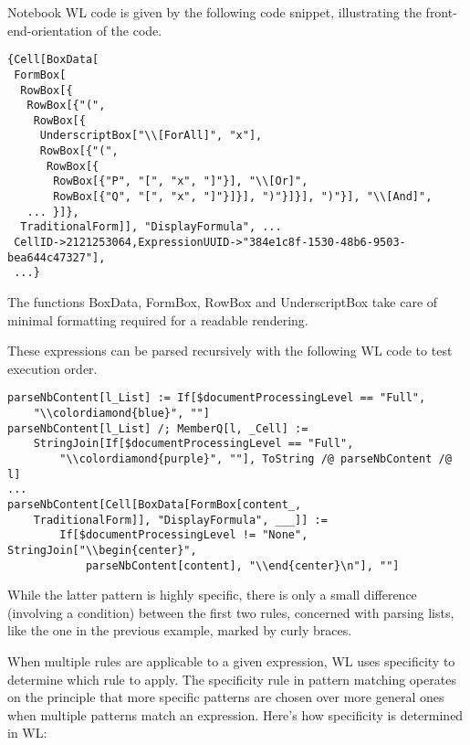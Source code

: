 Notebook WL code is given by the following code snippet, illustrating the front-end-orientation of the code.

\begin{verbatim}
{Cell[BoxData[
 FormBox[
  RowBox[{
   RowBox[{"(", 
    RowBox[{
     UnderscriptBox["\\[ForAll]", "x"], 
     RowBox[{"(", 
      RowBox[{
       RowBox[{"P", "[", "x", "]"}], "\\[Or]", 
       RowBox[{"Q", "[", "x", "]"}]}], ")"}]}], ")"}], "\\[And]", 
   ... }]}, 
  TraditionalForm]], "DisplayFormula", ...
 CellID->2121253064,ExpressionUUID->"384e1c8f-1530-48b6-9503-bea644c47327"],
 ...}
\end{verbatim}

The functions BoxData, FormBox, RowBox and UnderscriptBox take care of minimal formatting required for a readable rendering. 

These expressions can be parsed recursively with the following WL code to test execution order.

\begin{verbatim}
parseNbContent[l_List] := If[$documentProcessingLevel == "Full", 
    "\\colordiamond{blue}", ""]
parseNbContent[l_List] /; MemberQ[l, _Cell] := 
    StringJoin[If[$documentProcessingLevel == "Full", 
        "\\colordiamond{purple}", ""], ToString /@ parseNbContent /@ l] 
...
parseNbContent[Cell[BoxData[FormBox[content_, 
    TraditionalForm]], "DisplayFormula", ___]] := 
        If[$documentProcessingLevel != "None", StringJoin["\\begin{center}", 
            parseNbContent[content], "\\end{center}\n"], ""]
\end{verbatim}

While the latter pattern is highly specific, there is only a small difference (involving a condition) between the first two rules, concerned with parsing lists, like the one in the previous example, marked by curly braces.

When multiple rules are applicable to a given expression, WL uses specificity to determine which rule to apply. The specificity rule in pattern matching operates on the principle that more specific patterns are chosen over more general ones when multiple patterns match an expression. Here's how specificity is determined in WL:

